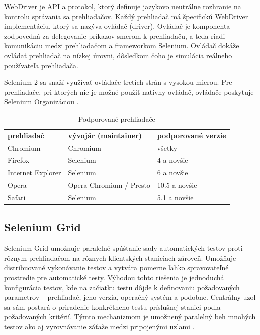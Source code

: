 WebDriver je \acs{API} a protokol, ktorý definuje jazykovo neutrálne rozhranie na kontrolu správania sa prehliadačov. Každý prehliadač má špecifickú WebDriver implementáciu, ktorý sa nazýva ovládač (driver). Ovládač je komponenta zodpovedná za delegovanie príkazov smerom k prehliadaču, a teda riadi komunikáciu medzi prehliadačom a frameworkom Selenium. Ovládač dokáže ovládať prehliadač na nízkej úrovni, dôsledkom čoho je simulácia reálneho používateľa prehliadača. 

Selenium 2 sa snaží využívať ovládače tretích strán s vysokou mierou. Pre prehliadače, pri ktorých nie je možné použiť natívny ovládač, ovládače poskytuje Selenium Organizáciou \cite{selenium-doc,selenium-doc-new}.

\begin{table}[h]
\centering
\caption{Podporované prehliadače}
\label{table:supported-browsers}
\begin{tabular}{lll}
\textbf{prehliadač} & \textbf{vývojár (maintainer)} & \textbf{podporované verzie} \\
Chromium            & Chromium                      & všetky                      \\
Firefox             & Selenium                      & 4 a novšie                  \\
Internet Explorer   & Selenium                      & 6 a novšie                  \\
Opera               & Opera Chromium / Presto       & 10.5 a novšie               \\
Safari              & Selenium                      & 5.1 a novšie               
\end{tabular}
\end{table}

\subsection{Selenium Grid}
Selenium Grid umožnuje paralelné spúštanie sady automatických testov proti rôznym prehliadačom na rôznych klientských staniciach zároveň. Umožňuje distribuované vykonávanie testov a vytvára pomerne ľahko spravovateľné prostredie pre automatické testy. Výhodou tohto riešenia je jednoduchá konfigurácia testov, kde na začiatku testu dôjde k definovaniu požadovaných parametrov – prehliadač, jeho verzia, operačný systém a podobne. Centrálny uzol sa sám postará o priradenie konkrétneho testu príslušnej stanici podľa požadovaných kritérií. Týmto mechanizmom je umožnený paralelný beh mnohých testov ako aj vyrovnávanie záťaže medzi pripojenými uzlami \cite{thesis-automation-testing,selenium-wikipedia}.
